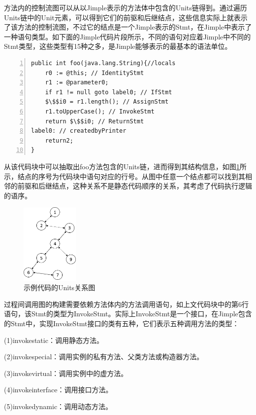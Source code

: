 方法内的控制流图可以从以Jimple表示的方法体中包含的Units链得到。通过遍历Units链中的Unit元素，可以得到它们的前驱和后继结点，这些信息实际上就表示了该方法的控制流图，不过它的结点是一个Jimple表示的Stmt，在Jimple中表示了一种语句类型。如下面的Jimple代码片段所示，不同的语句对应着Jimple中不同的Stmt类型，这些类型有15种之多，是Jimple能够表示的最基本的语法单位。
\begin{lstlisting}[language={[AspectJ]Java},numbers=left,keywordstyle=\color{blue!70},commentstyle=\color{red!50!green!50!blue!50},frame=shadowbox, rulesepcolor=\color{red!20!green!20!blue!20}] 
public int foo(java.lang.String){//locals
    r0 := @this; // IdentityStmt
    r1 := @parameter0;
    if r1 != null goto label0; // IfStmt
    $\$$i0 = r1.length(); // AssignStmt
    r1.toUpperCase(); // InvokeStmt
    return $\$$i0; // ReturnStmt
label0: // createdbyPrinter
    return2;
}
\end{lstlisting}
从该代码块中可以抽取出foo方法包含的Units链，进而得到其结构信息，如图\ref{fig:figure4-5}所示，结点的序号为代码块中语句对应的行号。从图中任意一个结点都可以找到其相邻的前驱和后继结点，这种关系不是静态代码顺序的关系，其考虑了代码执行逻辑的语序。

\begin{figure}
	\centering
	\includegraphics[width=0.25\textwidth]{figures/Units4-5}
	\caption{示例代码的Units关系图}\label{fig:figure4-5}
\end{figure}

过程间调用图的构建需要依赖方法体内的方法调用语句，如上文代码块中的第6行语句，该Stmt的类型为InvokeStmt。实际上InvokeStmt是一个接口，在Jimple包含的Stmt中，实现InvokeStmt接口的类有五种，它们表示五种调用方法的类型：

(1)invokestatic：调用静态方法。

(2)invokespecial：调用实例的私有方法、父类方法或构造器方法。

(3)invokevirtual：调用实例中的虚方法。

(4)invokeinterface：调用接口方法。

(5)invokedynamic：调用动态方法。


